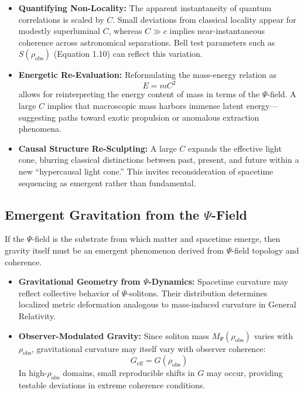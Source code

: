 \begin{itemize}
    \item \textbf{Quantifying Non-Locality:} The apparent instantaneity of quantum correlations is scaled by $C$. Small deviations from classical locality appear for modestly superluminal $C$, whereas $C \gg c$ implies near-instantaneous coherence across astronomical separations. Bell test parameters such as $S(\rho_{\text{obs}})$ (Equation 1.10) can reflect this variation.
    \item \textbf{Energetic Re-Evaluation:} Reformulating the mass-energy relation as
    \[
        E = m C^2
    \]
    allows for reinterpreting the energy content of mass in terms of the $\Psi$-field. A large $C$ implies that macroscopic mass harbors immense latent energy—suggesting paths toward exotic propulsion or anomalous extraction phenomena.
    \item \textbf{Causal Structure Re-Sculpting:} A large $C$ expands the effective light cone, blurring classical distinctions between past, present, and future within a new “hypercausal light cone.” This invites reconsideration of spacetime sequencing as emergent rather than fundamental.
\end{itemize}

\subsection{Emergent Gravitation from the $\Psi$-Field}
\label{subsec:gravity}

If the $\Psi$-field is the substrate from which matter and spacetime emerge, then gravity itself must be an emergent phenomenon derived from $\Psi$-field topology and coherence.

\begin{itemize}
    \item \textbf{Gravitational Geometry from $\Psi$-Dynamics:} Spacetime curvature may reflect collective behavior of $\Psi$-solitons. Their distribution determines localized metric deformation analogous to mass-induced curvature in General Relativity.
    \item \textbf{Observer-Modulated Gravity:} Since soliton mass $M_\Psi(\rho_{\text{obs}})$ varies with $\rho_{\text{obs}}$, gravitational curvature may itself vary with observer coherence:
    \[
        G_{\text{eff}} = G(\rho_{\text{obs}})
    \]
    In high-$\rho_{\text{obs}}$ domains, small reproducible shifts in $G$ may occur, providing testable deviations in extreme coherence conditions.
\end{itemize}

